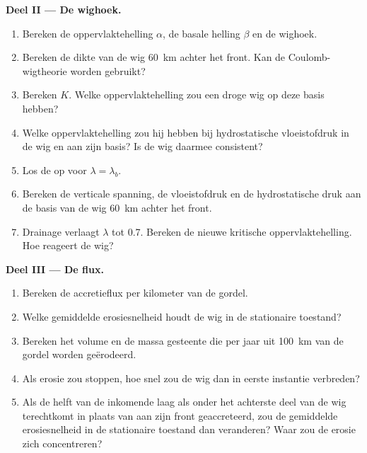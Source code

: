 \begin{problem}
\medskip\noindent\textbf{Deel II --- De wighoek.}
\begin{enumerate}[resume]
  \item Bereken de oppervlaktehelling $\alpha$, de basale helling $\beta$ en de
        wighoek.
  \item Bereken de dikte van de wig \qty{60}{km} achter het front. Kan
        de Coulomb-wigtheorie worden gebruikt?
  \item Bereken $K$. Welke oppervlaktehelling zou een droge wig op deze basis hebben?
  \item Welke oppervlaktehelling zou hij hebben bij hydrostatische vloeistofdruk in
        de wig en aan zijn basis? Is de wig daarmee consistent?
  \item Los de  op voor $\lambda = \lambda_b$.
  \item Bereken de verticale spanning, de vloeistofdruk en de hydrostatische
        druk aan de basis van de wig \qty{60}{km} achter het front.
  \item Drainage verlaagt $\lambda$ tot 0.7. Bereken de nieuwe kritische
        oppervlaktehelling. Hoe reageert de wig?
\end{enumerate}

\medskip\noindent\textbf{Deel III --- De flux.}
\begin{enumerate}[resume]
  \item Bereken de accretieflux per kilometer van de gordel.
  \item Welke gemiddelde erosiesnelheid houdt de wig in de stationaire toestand?
  \item Bereken het volume en de massa gesteente die per jaar uit
        \qty{100}{km} van de gordel worden geërodeerd.
  \item Als erosie zou stoppen, hoe snel zou de wig dan in eerste instantie verbreden?
  \item Als de helft van de inkomende laag als  onder het achterste deel
        van de wig terechtkomt in plaats van aan zijn front geaccreteerd, zou de gemiddelde
        erosiesnelheid in de stationaire toestand dan veranderen? Waar zou de erosie zich concentreren?
\end{enumerate}


\end{problem}
